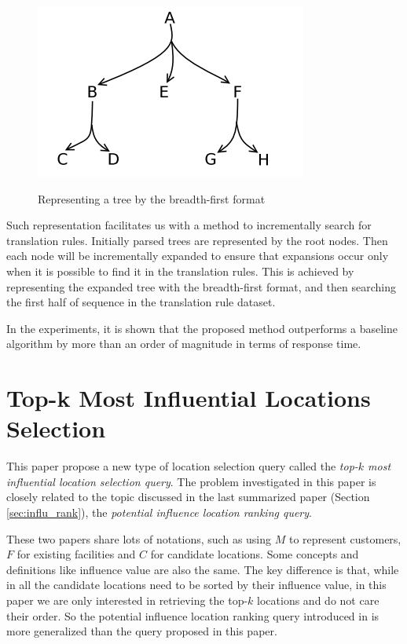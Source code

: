 \documentclass[paper=a4, fontsize=18pt]{article} %
\numberwithin{equation}{section} %
\numberwithin{figure}{section} %
\numberwithin{table}{section} %
\begin{document}
\begin{figure}
  \centering
  \includegraphics[width=.4\linewidth]{74_2.png}\\
  \caption{Representing a tree by the breadth-first format}\label{fig:tree}
\end{figure}

Such representation facilitates us with a method to incrementally search for translation rules. Initially parsed trees are represented by the root nodes. Then each node will be incrementally expanded to ensure that expansions occur only when it is possible to find it in the translation rules. This is achieved by representing the expanded tree with the breadth-first format, and then searching the first half of sequence in the translation rule dataset.

In the experiments, it is shown that the proposed method outperforms a baseline algorithm by more than an order of magnitude in terms of response time.

\section{Top-k Most Influential Locations Selection \cite{HWQZCH11}}

This paper propose a new type of location selection query called the \emph{top-$k$ most influential location selection query}. The problem investigated in this paper is closely related to the topic discussed in the last summarized paper (Section \ref{sec:influ_rank}), the \emph{potential influence location ranking query}.

These two papers share lots of notations, such as using $M$ to represent customers, $F$ for existing facilities and $C$ for candidate locations. Some concepts and definitions like influence value are also the same. The key difference is that, while in \cite{HWPTXZ11} all the candidate locations need to be sorted by their influence value, in this paper we are only interested in retrieving the top-$k$ locations and do not care their order. So the potential influence location ranking query introduced in \cite{HWPTXZ11} is more generalized than the query proposed in this paper.
\end{document}
